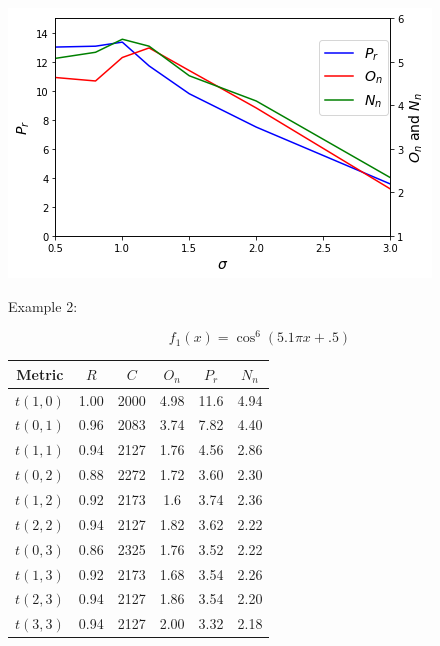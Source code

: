 \documentclass[smallextended]{svjour3}       %
\begin{document}
\begin{multicols}{2}
\begin{center}
  \includegraphics[width=\linewidth]{GA_images/sigma-parameter.png}
  \label{fig:sigma}
\end{center}

Example 2:


$$
f_{1}(x)=\cos^{6}(5.1 \pi x+.5)
$$


\begin{tabular}{cccccc}
	\toprule
    Metric & $R$ & $C$ & $O_{n}$ & $P_{r}$ & $N_{n}$\\
	\midrule
    $t(1,0)$ & 1.00 & 2000 & 4.98 & 11.6 & 4.94 \\
    $t(0,1)$ & 0.96 & 2083 & 3.74 & 7.82 & 4.40 \\
    $t(1,1)$ & 0.94 & 2127 & 1.76 & 4.56 & 2.86 \\
    $t(0,2)$ & 0.88 & 2272 & 1.72 & 3.60 & 2.30 \\
    $t(1,2)$ & 0.92 & 2173 & 1.6 & 3.74 & 2.36 \\
    $t(2,2)$ & 0.94 & 2127 & 1.82 & 3.62 & 2.22 \\
    $t(0,3)$ & 0.86 & 2325 & 1.76 & 3.52 & 2.22 \\
    $t(1,3)$ & 0.92 & 2173 & 1.68 & 3.54 & 2.26 \\
    $t(2,3)$ & 0.94 & 2127 & 1.86 & 3.54 & 2.20 \\
    $t(3,3)$ & 0.94 & 2127 & 2.00 & 3.32 & 2.18 \\
	\bottomrule
\end{tabular}



\end{multicols}
\end{document}
